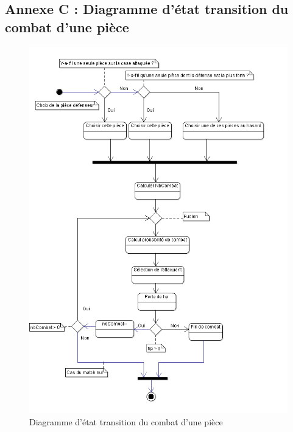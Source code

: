 \subsection{Annexe C : Diagramme d'état transition du combat d'une pièce}
\begin{figure}[!h]
\centering
\includegraphics[width=1\textwidth]{img/Combat.png}
\caption{Diagramme d'état transition du combat d'une pièce}
\end{figure}
\clearpage

